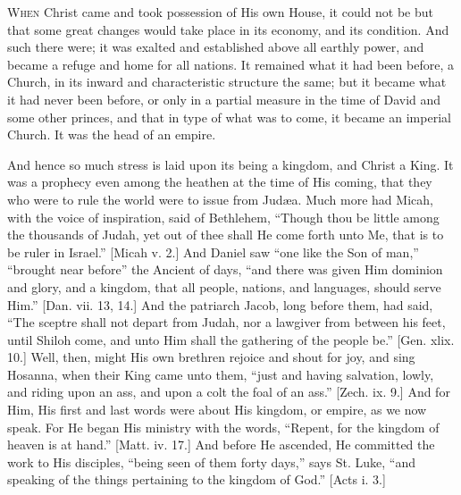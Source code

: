 W\textsc{hen} Christ came and took possession of His own House, it could not
be but that some great changes would take place in its economy, and
its condition. And such there were; it was exalted and established
above all earthly power, and became a refuge and home for all nations.
It remained what it had been before, a Church, in its inward and
characteristic structure the same; but it became what it had never
been before, or only in a partial measure in the time of David and
some other princes, and that in type of what was to come, it became an
imperial Church. It was the head of an empire.

And hence so much stress is laid upon its being a kingdom, and
Christ a King. It was a prophecy even among the heathen at the time of
His coming, that they who were to rule the world were to issue from
Judæa. Much more had Micah, with the voice of inspiration, said of
Bethlehem, ``Though thou be little among the thousands of Judah,
yet out of thee shall He come forth unto Me, that is to be ruler in
Israel.'' [Micah v. 2.] And Daniel saw ``one like the Son of
man,'' ``brought near before'' the Ancient of days,
``and there was given Him dominion and glory, and a kingdom, that
all people, nations, and languages, should serve Him.'' [Dan. vii.
13, 14.] And the patriarch Jacob, long before them, had said,
``The sceptre shall not depart from Judah, nor a lawgiver from
between his feet, until Shiloh come, and unto Him shall the gathering
of the people be.'' [Gen. xlix. 10.] Well, then, might His own
brethren rejoice and shout for joy, and sing Hosanna, when their King
came unto them, ``just and having salvation, lowly, and riding
upon an ass, and upon a colt the foal of an ass.'' [Zech. ix. 9.]
And for Him, His first and last words were about His kingdom, or
empire, as we now speak. For He began His ministry with the words,
``Repent, for the kingdom of heaven is at hand.'' [Matt. iv.
17.] And before He ascended, He committed the work to His disciples,
``being seen of them forty days,'' says St. Luke, ``and
speaking of the things pertaining to the kingdom of God.'' [Acts i.
3.]

